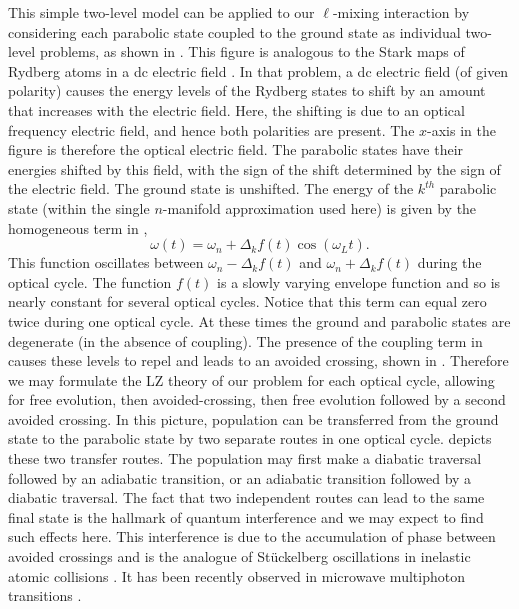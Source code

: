 This simple two-level model can be applied to our $\ell$-mixing interaction by
considering each parabolic state coupled to the ground state as individual
two-level problems, as shown in .  This figure is analogous to
the Stark maps of Rydberg atoms in a dc electric field \cite{Zimmerman:79}.   In
that problem, a dc electric field (of given polarity) causes the energy levels of
the Rydberg states to shift by an amount that increases with the electric field. 
Here, the shifting is due to an optical frequency electric field, and hence both
polarities are present.  The $x$-axis in the figure is therefore the optical
electric field.  The parabolic states have their energies shifted by this field,
with the sign of the shift determined by the sign of the electric field.  The
ground state is unshifted. The energy of the $k^{th}$ parabolic state
(within the single $n$-manifold approximation used here) is given by the
homogeneous term in ,
\begin{equation}
\omega(t) = \omega_n + \Delta_k f(t) \cos(\omega_L t) .
\end{equation} This function oscillates between $\omega_n - \Delta_k f(t)$ and
$\omega_n + \Delta_k f(t)$ during the optical cycle.  The function $f(t)$ is a
slowly varying envelope function and so is nearly constant for several optical
cycles.  Notice that this term can equal zero twice during one optical cycle.
At these times the ground and parabolic states are degenerate (in the absence
of coupling).  The presence of the coupling term in  causes
these levels to repel and leads to an avoided crossing, shown in .
Therefore we may formulate the LZ theory of our problem for each optical cycle,
allowing for free evolution, then avoided-crossing, then free evolution followed
by a second avoided crossing.  In this picture, population can be transferred
from the ground state to the parabolic state by two separate routes in one
optical cycle.   depicts these two transfer routes. The population
may first make a diabatic traversal followed by an adiabatic transition, or
an adiabatic transition followed by a diabatic traversal.  The fact that two
independent routes can lead to the same final state is the hallmark of quantum
interference and we may expect to find such effects here.  This interference is
due to the accumulation of phase between avoided crossings and is the analogue of
St\"{u}ckelberg oscillations in inelastic atomic collisions
\cite{Stuckelberg:32}.  It has been recently observed in microwave
multiphoton transitions \cite{Gatzke:95}.


